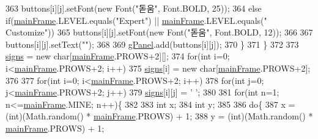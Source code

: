 \begin{DoxyCode}
363                     buttons[i][j].setFont(\textcolor{keyword}{new} Font(\textcolor{stringliteral}{"돋움"}, Font.BOLD, 25));
364                 \textcolor{keywordflow}{else} \textcolor{keywordflow}{if}(\hyperlink{classpkg_1_1main_frame_a0edb10d75697656c940f3b5e3ba7d9ef}{mainFrame}.LEVEL.equals(\textcolor{stringliteral}{"Expert"}) || \hyperlink{classpkg_1_1main_frame_a0edb10d75697656c940f3b5e3ba7d9ef}{mainFrame}.LEVEL.equals(\textcolor{stringliteral}{"
      Customize"}))
365                     buttons[i][j].setFont(\textcolor{keyword}{new} Font(\textcolor{stringliteral}{"돋움"}, Font.BOLD, 12));
366                 
367                 buttons[i][j].setText(\textcolor{stringliteral}{""});
368                 
369                 \hyperlink{classpkg_1_1main_frame_a17ea45ba089445a24b9da9bf561f6603}{gPanel}.add(buttons[i][j]);
370             \}
371         \}
372         
373         \hyperlink{classpkg_1_1main_frame_ae3c9f6e7ee48c1661dc3fe814fd67554}{signs} = \textcolor{keyword}{new} \textcolor{keywordtype}{char}[\hyperlink{classpkg_1_1main_frame_a0edb10d75697656c940f3b5e3ba7d9ef}{mainFrame}.PROWS+2][];
374         \textcolor{keywordflow}{for}(\textcolor{keywordtype}{int} i=0; i<\hyperlink{classpkg_1_1main_frame_a0edb10d75697656c940f3b5e3ba7d9ef}{mainFrame}.PROWS+2; i++)
375             \hyperlink{classpkg_1_1main_frame_ae3c9f6e7ee48c1661dc3fe814fd67554}{signs}[i] = \textcolor{keyword}{new} \textcolor{keywordtype}{char}[\hyperlink{classpkg_1_1main_frame_a0edb10d75697656c940f3b5e3ba7d9ef}{mainFrame}.PROWS+2];
376         
377         \textcolor{keywordflow}{for}(\textcolor{keywordtype}{int} i=0; i<\hyperlink{classpkg_1_1main_frame_a0edb10d75697656c940f3b5e3ba7d9ef}{mainFrame}.PROWS+2; i++)
378             \textcolor{keywordflow}{for}(\textcolor{keywordtype}{int} j=0; j<\hyperlink{classpkg_1_1main_frame_a0edb10d75697656c940f3b5e3ba7d9ef}{mainFrame}.PROWS+2; j++)
379                 \hyperlink{classpkg_1_1main_frame_ae3c9f6e7ee48c1661dc3fe814fd67554}{signs}[i][j] = \textcolor{charliteral}{' '};
380         
381         \textcolor{keywordflow}{for}(\textcolor{keywordtype}{int} n=1; n<=\hyperlink{classpkg_1_1main_frame_a0edb10d75697656c940f3b5e3ba7d9ef}{mainFrame}.MINE; n++)\{
382                 
383             \textcolor{keywordtype}{int} x;
384             \textcolor{keywordtype}{int} y;
385             
386             \textcolor{keywordflow}{do}\{
387                 x = (int)(Math.random() * \hyperlink{classpkg_1_1main_frame_a0edb10d75697656c940f3b5e3ba7d9ef}{mainFrame}.PROWS) + 1;
388                 y = (int)(Math.random() * \hyperlink{classpkg_1_1main_frame_a0edb10d75697656c940f3b5e3ba7d9ef}{mainFrame}.PROWS) + 1;

\end{DoxyCode}
